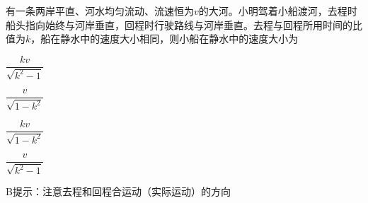 有一条两岸平直、河水均匀流动、流速恒为\(v\)的大河。小明驾着小船渡河，去程时船头指向始终与河岸垂直，回程时行驶路线与河岸垂直。去程与回程所用时间的比值为\(k\)，船在静水中的速度大小相同，则小船在静水中的速度大小为\paren[]
\begin{choices}
	\item \(\dfrac{kv}{\sqrt{k^2 - 1}}\)
	\item \(\dfrac{v}{\sqrt{1 - k^2}}\)
	\item \(\dfrac{kv}{\sqrt{1 - k^2}}\)
	\item \(\dfrac{v}{\sqrt{k^2 - 1}}\)
\end{choices}
\begin{answer}
	B\qquad 提示：注意去程和回程合运动（实际运动）的方向
\end{answer}